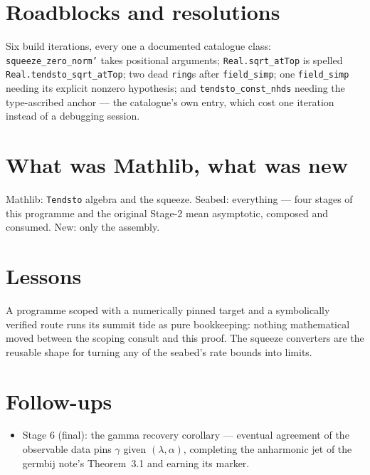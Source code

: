 \documentclass[11pt]{article}
\begin{document}
\section{Roadblocks and resolutions}

Six build iterations, every one a documented catalogue class:
\texttt{squeeze\_zero\_norm'} takes positional arguments;
\texttt{Real.sqrt\_atTop} is spelled \texttt{Real.tendsto\_sqrt\_atTop};
two dead \texttt{ring}s after \texttt{field\_simp}; one
\texttt{field\_simp} needing its explicit nonzero hypothesis; and
\texttt{tendsto\_const\_nhds} needing the type-ascribed anchor --- the
catalogue's own entry, which cost one iteration instead of a debugging
session.

\section{What was Mathlib, what was new}

Mathlib: \texttt{Tendsto} algebra and the squeeze. Seabed: everything
--- four stages of this programme and the original Stage-2 mean
asymptotic, composed and consumed. New: only the assembly.

\section{Lessons}

A programme scoped with a numerically pinned target and a symbolically
verified route runs its summit tide as pure bookkeeping: nothing
mathematical moved between the scoping consult and this proof. The
squeeze converters are the reusable shape for turning any of the
seabed's rate bounds into limits.

\section{Follow-ups}

\begin{itemize}
\item Stage 6 (final): the gamma recovery corollary --- eventual
agreement of the observable data pins $\gamma$ given
$(\lambda, \alpha)$, completing the anharmonic jet of the germbij
note's Theorem~3.1 and earning its marker.
\end{itemize}
\end{document}
